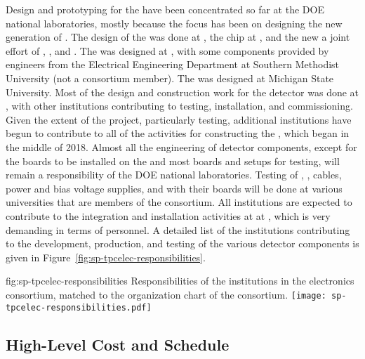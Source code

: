 Design and prototyping for the    have been 
concentrated so far at the DOE national laboratories, mostly because the 
focus has been on designing the new generation of . The design 
of the  was done at , the  
chip at , and the new  a joint effort of 
, , and . The  
 was designed at , with some components 
provided by engineers from the Electrical Engineering Department
at Southern Methodist University (not a consortium member).
The  was designed at Michigan State University.
Most of the design and construction work for the  detector 
was done at , with other institutions contributing to 
testing, installation, and commissioning. Given the extent of the project, 
particularly testing, additional institutions have begun to contribute
to all of the activities for constructing the   , which began 
in the middle of 2018. Almost all the engineering of detector components, 
except for the boards to be installed on the  and most boards 
and setups for testing, will remain a responsibility
of the DOE national laboratories. Testing of 
, , cables, power and bias voltage supplies,
and  with their boards will be done at various
universities that are members of the consortium. All institutions
are expected to contribute to the integration and installation activities at
at , which is very
demanding in terms of personnel. A detailed list of the 
institutions contributing to the development, production, and
testing of the various detector components is given in Figure~\ref{fig:sp-tpcelec-responsibilities}.

\begin{dunefigure}
{fig:sp-tpcelec-responsibilities}
{Responsibilities of the institutions in the  electronics 
consortium, matched to the organization chart of the consortium.}
\texttt{[image: sp-tpcelec-responsibilities.pdf]}
\end{dunefigure}

\subsection{High-Level Cost and Schedule}
\label{sec:fdsp-tpcelec-management-cost}

